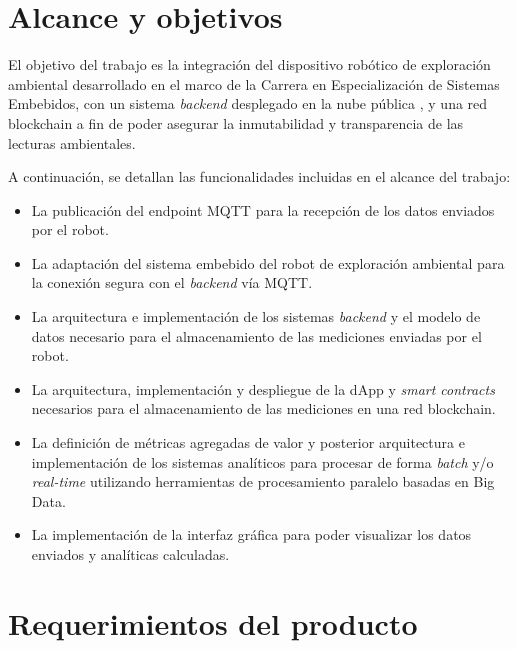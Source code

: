 
\section{Alcance y objetivos}

El objetivo del trabajo es la integración del dispositivo robótico de exploración ambiental \citep{cese_gonzalo_memoria} desarrollado en el marco de la Carrera en Especialización de Sistemas Embebidos, con un sistema \textit{backend} desplegado en la nube pública \citep{nube_publica}, y una red blockchain \cite{blockchain} a fin de poder asegurar la inmutabilidad y transparencia de las lecturas ambientales. 

A continuación, se detallan las funcionalidades incluidas en el alcance del trabajo:


\begin{itemize}
	\item La publicación del endpoint MQTT \citep{mqtt_spec} para la recepción de los datos enviados por el robot.
	\item La adaptación del sistema embebido del robot de exploración ambiental para la conexión segura con el \textit{backend} vía MQTT.
	\item La arquitectura e implementación de los sistemas \textit{backend} y el modelo de datos necesario para el almacenamiento de las mediciones enviadas por el robot.
	\item La arquitectura, implementación y despliegue de la dApp \citep{dapp} y \textit{smart contracts} \citep{smart_contracts} necesarios para el almacenamiento de las mediciones en una red blockchain.
	\item La definición de métricas agregadas de valor y posterior arquitectura e implementación de los sistemas analíticos para procesar de forma \textit{batch} y/o \textit{real-time} utilizando herramientas de procesamiento paralelo basadas en Big Data.
	\item La implementación de la interfaz gráfica para poder visualizar los datos enviados y analíticas calculadas.

\end{itemize}




\section{Requerimientos del producto}


